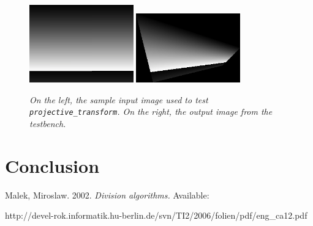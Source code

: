 \documentclass[10pt]{article}
\begin{document}
\begin{figure}[h!]
\centering
\includegraphics[width=0.4\textwidth]{images/original.png}
\includegraphics[width=0.4\textwidth]{images/output.png}
\caption{\emph{On the left, the sample input image used to test {\tt projective\_transform}. On the right, the output image from the testbench.}}
\end{figure}

 
\section{Conclusion}

\begin{thebibliography}{9}

  Malek, Miroslaw.
  2002.
  \emph{Division algorithms.}
  Available: \\ \begin{url} http://devel-rok.informatik.hu-berlin.de/svn/TI2/2006/folien/pdf/eng\_ca12.pdf \end{url}

\end{thebibliography}
\end{document}
